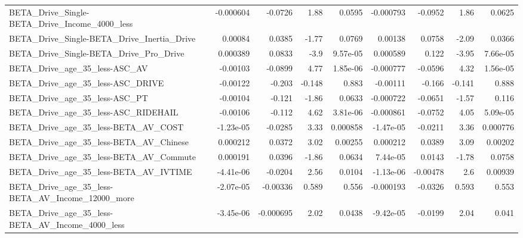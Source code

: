 \begin{tabular}{lrrrrrrrr}
BETA\_Drive\_Single-BETA\_Drive\_Income\_4000\_less      &   -0.000604 &      -0.0726 &     1.88 &   0.0595 &  -0.000793 &     -0.0952 &         1.86 &        0.0625 \\
BETA\_Drive\_Single-BETA\_Drive\_Inertia\_Drive         &     0.00084 &       0.0385 &    -1.77 &   0.0769 &    0.00138 &      0.0758 &        -2.09 &        0.0366 \\
BETA\_Drive\_Single-BETA\_Drive\_Pro\_Drive             &    0.000389 &       0.0833 &     -3.9 & 9.57e-05 &   0.000589 &       0.122 &        -3.95 &      7.66e-05 \\
BETA\_Drive\_age\_35\_less-ASC\_AV                      &    -0.00103 &      -0.0899 &     4.77 & 1.85e-06 &  -0.000777 &     -0.0596 &         4.32 &      1.56e-05 \\
BETA\_Drive\_age\_35\_less-ASC\_DRIVE                   &    -0.00122 &       -0.203 &   -0.148 &    0.883 &   -0.00111 &      -0.166 &       -0.141 &         0.888 \\
BETA\_Drive\_age\_35\_less-ASC\_PT                      &    -0.00104 &       -0.121 &    -1.86 &   0.0633 &  -0.000722 &     -0.0651 &        -1.57 &         0.116 \\
BETA\_Drive\_age\_35\_less-ASC\_RIDEHAIL                &    -0.00106 &       -0.112 &     4.62 & 3.81e-06 &  -0.000861 &     -0.0752 &         4.05 &      5.09e-05 \\
BETA\_Drive\_age\_35\_less-BETA\_AV\_COST                &   -1.23e-05 &      -0.0285 &     3.33 & 0.000858 &  -1.47e-05 &     -0.0211 &         3.36 &      0.000776 \\
BETA\_Drive\_age\_35\_less-BETA\_AV\_Chinese             &    0.000212 &       0.0372 &     3.02 &  0.00255 &   0.000212 &      0.0389 &         3.09 &       0.00202 \\
BETA\_Drive\_age\_35\_less-BETA\_AV\_Commute             &    0.000191 &       0.0396 &    -1.86 &   0.0634 &   7.44e-05 &      0.0143 &        -1.78 &        0.0758 \\
BETA\_Drive\_age\_35\_less-BETA\_AV\_IVTIME              &   -4.41e-06 &      -0.0204 &     2.56 &   0.0104 &  -1.13e-06 &    -0.00478 &          2.6 &       0.00939 \\
BETA\_Drive\_age\_35\_less-BETA\_AV\_Income\_12000\_more   &   -2.07e-05 &     -0.00336 &    0.589 &    0.556 &  -0.000193 &     -0.0326 &        0.593 &         0.553 \\
BETA\_Drive\_age\_35\_less-BETA\_AV\_Income\_4000\_less    &   -3.45e-06 &    -0.000695 &     2.02 &   0.0438 &  -9.42e-05 &     -0.0199 &         2.04 &         0.041 \\

\end{tabular}
